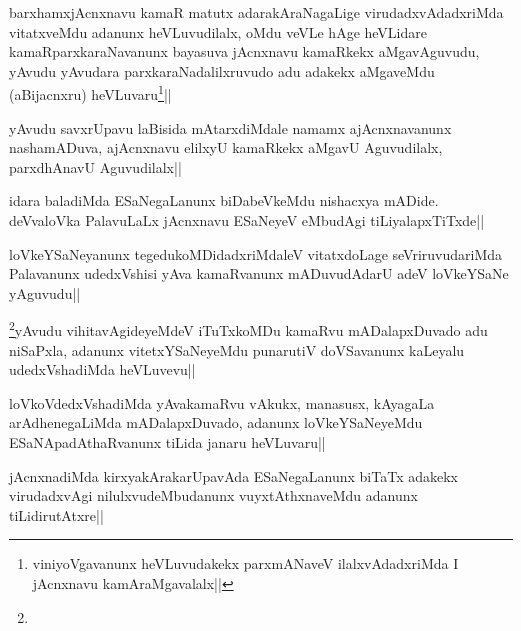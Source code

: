 
\begin{artha}
barxhamxjAcnxnavu kamaR matutx adarakAraNagaLige virudadxvAdadxriMda vitatxveMdu adanunx heVLuvudilalx, oMdu veVLe hAge heVLidare kamaRparxkaraNavanunx bayasuva jAcnxnavu kamaRkekx aMgavAguvudu, yAvudu yAvudara parxkaraNadalilxruvudo adu adakekx aMgaveMdu (aBijacnxru) heVLuvaru\footnote{viniyoVgavanunx heVLuvudakekx parxmANaveV ilalxvAdadxriMda I jAcnxnavu kamAraMgavalalx||}||
\end{artha}


\begin{artha}
yAvudu savxrUpavu laBisida mAtarxdiMdale namamx ajAcnxnavanunx nashamADuva, ajAcnxnavu elilxyU kamaRkekx aMgavU Aguvudilalx, parxdhAnavU Aguvudilalx||
\end{artha}

\begin{artha}
idara baladiMda ESaNegaLanunx biDabeVkeMdu nishacxya mADide. deVvaloVka PalavuLaLx jAcnxnavu ESaNeyeV eMbudAgi tiLiyalapxTiTxde||
\end{artha}

\begin{artha}
loVkeYSaNeyanunx tegedukoMDidadxriMdaleV vitatxdoLage seVriruvudariMda Palavanunx udedxVshisi yAva kamaRvanunx mADuvudAdarU adeV loVkeYSaNe yAguvudu||
\end{artha}


\begin{artha}
\footnote{}yAvudu vihitavAgideyeMdeV iTuTxkoMDu kamaRvu mADalapxDuvado adu niSaPxla, adanunx vitetxYSaNeyeMdu punarutiV doVSavanunx kaLeyalu udedxVshadiMda heVLuvevu||
\end{artha}


\begin{artha}
loVkoVdedxVshadiMda yAvakamaRvu vAkukx, manasusx, kAyagaLa arAdhenegaLiMda mADalapxDuvado, adanunx loVkeYSaNeyeMdu ESaNApadAthaRvanunx tiLida janaru heVLuvaru||
\end{artha}


\begin{artha}
jAcnxnadiMda kirxyakArakarUpavAda ESaNegaLanunx biTaTx adakekx virudadxvAgi nilulxvudeMbudanunx vuyxtAthxnaveMdu adanunx tiLidirutAtxre||
\end{artha}

